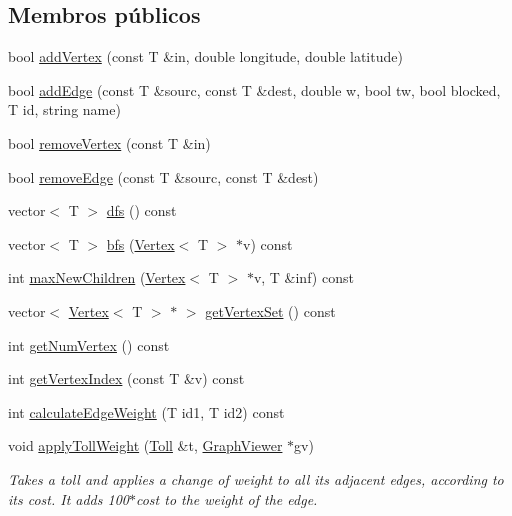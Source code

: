 \subsection*{Membros públicos}
\begin{DoxyCompactItemize}
\item 
bool \hyperlink{class_graph_a6283650774199e3dc971f226eb35cf50}{add\+Vertex} (const T \&in, double longitude, double latitude)
\item 
bool \hyperlink{class_graph_add7835e0874b6bb515980db864e39a86}{add\+Edge} (const T \&sourc, const T \&dest, double w, bool tw, bool blocked, T id, string name)
\item 
bool \hyperlink{class_graph_af9c903104ad69a7782979fa9caedf163}{remove\+Vertex} (const T \&in)
\item 
bool \hyperlink{class_graph_a1106092a37366486cf55576f9ec01692}{remove\+Edge} (const T \&sourc, const T \&dest)
\item 
vector$<$ T $>$ \hyperlink{class_graph_a3f62ba0e37c5c011299c93d60e3a8be3}{dfs} () const 
\item 
vector$<$ T $>$ \hyperlink{class_graph_a0e9598b98be2570eb432690411a577e8}{bfs} (\hyperlink{class_vertex}{Vertex}$<$ T $>$ $\ast$v) const 
\item 
int \hyperlink{class_graph_ab8fd74c3cf8dca6eaa82d39fd1216f52}{max\+New\+Children} (\hyperlink{class_vertex}{Vertex}$<$ T $>$ $\ast$v, T \&inf) const 
\item 
vector$<$ \hyperlink{class_vertex}{Vertex}$<$ T $>$ $\ast$ $>$ \hyperlink{class_graph_ab7dc5ec1c34df811d560021b726e95ec}{get\+Vertex\+Set} () const 
\item 
int \hyperlink{class_graph_a295932f117d92c825a97ec458e0fb332}{get\+Num\+Vertex} () const 
\item 
int \hyperlink{class_graph_a98ad6f08d48ceb7527cb37433c0efc56}{get\+Vertex\+Index} (const T \&v) const 
\item 
int \hyperlink{class_graph_a41708134b9e518beea032e6e62d84bef}{calculate\+Edge\+Weight} (T id1, T id2) const 
\item 
void \hyperlink{class_graph_a7b9a7f15067572593b8be54c59ac1b32}{apply\+Toll\+Weight} (\hyperlink{class_toll}{Toll} \&t, \hyperlink{class_graph_viewer}{Graph\+Viewer} $\ast$gv)
\begin{DoxyCompactList}\small\item\em Takes a toll and applies a change of weight to all its adjacent edges, according to its cost. It adds 100$\ast$cost to the weight of the edge. \end{DoxyCompactList}\item 

\end{DoxyCompactItemize}
